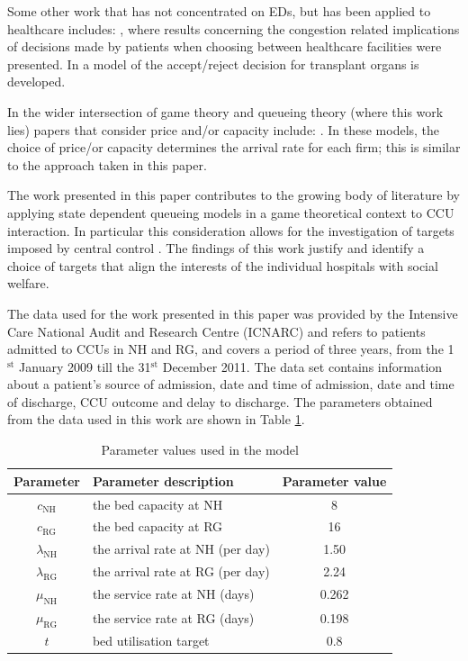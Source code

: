 \documentclass{article}
\newcommand{\NH}{\text{NH}}
\newcommand{\RG}{\text{RG}}
\begin{document}
Some other work that has not concentrated on EDs, but has been applied to healthcare includes: \cite{Knight2013}, where results concerning the congestion related implications of decisions made by patients when choosing between healthcare facilities were presented. In \cite{Howard2002} a model of the accept/reject decision for transplant organs is developed.

In the wider intersection of game theory and queueing theory (where this work lies) papers that consider price and/or capacity include: \cite{Allon2007, Cachon2002,  Cachon2007, Kalai1992, Levhari1978}. In these models, the choice of price/or capacity determines the arrival rate for each firm; this is similar to the approach taken in this paper.

The work presented in this paper contributes to the growing body of literature by applying state dependent queueing models in a game theoretical context to CCU interaction.
In particular this consideration allows for the investigation of targets imposed by central control \cite{Bevan2006}.
The findings of this work justify and identify a choice of targets that align the interests of the individual hospitals with social welfare.

The data used for the work presented in this paper was provided by the Intensive Care National Audit and Research Centre (ICNARC) and refers to patients admitted to CCUs in NH and RG, and covers a period of three years, from the 1$^{\text{st}}$ January 2009 till the 31$^{\text{st}}$ December 2011.
The data set contains information about a patient's source of admission, date and time of admission, date and time of discharge, CCU outcome and delay to discharge.
The parameters obtained from the data used in this work are shown in Table \ref{parameter_values_model_1}.

\begin{table}[!htbp]
\begin{center}
\begin{tabular}{c|lc}
\toprule
Parameter&Parameter description&Parameter value\\
\midrule
$c_{\NH}$&the bed capacity at NH&8\\
$c_{\RG}$&the bed capacity at RG&16\\
$\lambda_{\NH}$&the arrival rate at NH (per day)&1.50 \\
$\lambda_{\RG}$&the arrival rate at RG (per day)&2.24\\
$\mu_{\NH}$&the service rate at NH (days)&0.262\\
$\mu_{\RG}$&the service rate at RG (days)&0.198\\
$t$& bed utilisation target & 0.8\\
\bottomrule
\end{tabular}
\end{center}
\caption{Parameter values used in the model}\label{parameter_values_model_1}
\end{table}
\end{document}

